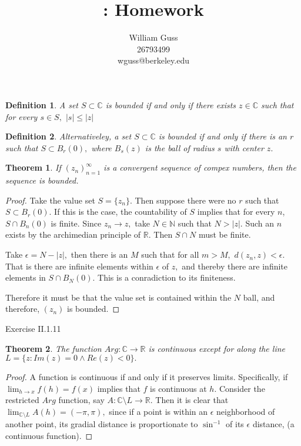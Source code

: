 \documentclass[letter]{article}
\title{\bCLASS: Homework \bHWN}
\author{William Guss\\26793499\\wguss@berkeley.edu}
\newtheorem{theorem}{Theorem}
\newtheorem{definition}{Definition}
\newenvironment{menumerate}{%
  \edef\backupindent{\the\parindent}%
  \enumerate%
  \setlength{\parindent}{\backupindent}%
}{\endenumerate}
\begin{document}
\maketitle
\thispagestyle{empty}


\begin{menumerate}
	\item
	\begin{definition}
		A set $S \subset \mathbb{C}$ is bounded if and only if there exists $ z \in \mathbb{C}$ such that for every $s \in S,$ $|s| \leq |z|$
	\end{definition}
	\begin{definition}
		Alternativeley, a set $S \subset \mathbb{C}$ is bounded if and only if there is an $r$  such that $S \subset B_r(0),$ where $B_s(z)$ is the ball of radius $s$ with center $z.$
	\end{definition}
	\begin{theorem}
		If $(z_n)^\infty_{n=1}$ is a convergent sequence of compex numbers,
		then the sequence is bounded.
	\end{theorem}
	\begin{proof}
		Take the value set $S = \{z_n\}.$ Then suppose there were no $r$ such that $S \subset B_r(0)$. If this is the case, the countability of $S$ implies that for every $n$, $S \cap B_n(0)$ is finite.
		Since $z_n \to z,$ take $N \in \mathbb{N}$ such that $N > |z|.$ Such an $n$ exists by the archimedian principle of $\mathbb{R}.$ Then $S \cap N$ must be finite. 

		Take $\epsilon = N - |z|,$ then there is an $M$ such that for all $m > M,$ $d(z_n,z) < \epsilon.$ That is there are infinite elements within $\epsilon$ of $z,$ and thereby there are infinite elements in $S \cap B_N(0).$ This is a conradiction to its finiteness.

		Therefore it must be that the value set is contained within the $N$ ball, and therefore,  $(z_n)$ is bounded. 
	\end{proof} 

	\item Exercise II.1.11
	\begin{theorem}
	The function $Arg : \mathbb{C} \to \mathbb{R}$ is continuous except for along the line $L = \{z : Im(z) = 0 \wedge Re(z) < 0\}.$
	\end{theorem}
	\begin{proof}
		A function is continuous if and only if it preserves limits. Specifically, if $\lim_{h \to x} f(h) = f(x) $ implies that $f$ is continuous at $h$. Consider the restricted $Arg$ function, say $A:\mathbb{C} \setminus L \to \mathbb{R}.$ Then it is clear that $\lim_{\mathbb{C}\setminus L} A(h) = (-\pi,\pi),$ since if a point is
		within an $\epsilon$ neighborhood of another point, its gradial distance is proportionate to $\sin^{-1}$ of its $\epsilon$ distance, (a continuous function).


\end{proof}
\end{menumerate}
\end{document}
